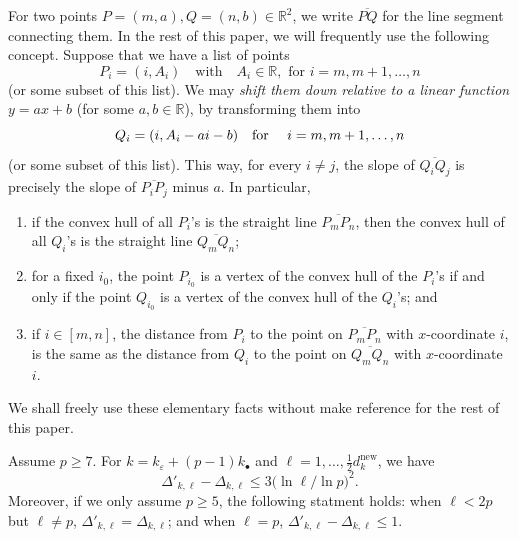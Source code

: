 \begin{notation}
    \label{N:linear_shift_down}
    For two points $P = (m, a), Q = (n,b) \in {\mathbb{R}}^2$, we write $\overline{PQ}$ for the line segment connecting them.
    In the rest of this paper, we will frequently use the following concept. Suppose that we have a list of points $$P_i = (i,A_i) \quad\textrm{with} \quad A_i \in {\mathbb{R}}, \textrm{ for } i = m,m+1, \dots, n$$ (or some subset of this list). We may \emph{shift them down relative to a linear function} $y = ax+b$ (for some $a,b \in {\mathbb{R}}$), by transforming them into $$Q_i  = (i, A_i - ai-b) \textrm{\quad for \quad}i = m,m+1, \dots, n$$ (or some subset of this list).
    This way, for every $i\neq j$, the slope of $\overline {Q_iQ_j}$ is precisely the slope of $\overline{P_iP_j}$ minus $a$. In particular,
    \begin{enumerate}
    \item
    if the convex hull of all $P_i$'s is the straight line $\overline{P_mP_n}$, then the convex hull of all $Q_i$'s is the straight line $\overline{Q_mQ_n}$;
    \item for a fixed $i_0$, the point $P_{i_0}$ is a vertex of the convex hull of the $P_i$'s if and only if the point $Q_{i_0}$ is a vertex of the convex hull of the $Q_i$'s; and
    \item if $i \in [m,n]$, the distance from $P_i$ to the point on $\overline{P_mP_n}$ with $x$-coordinate $i$, is the same as the distance from $Q_i$ to the point on $\overline{Q_mQ_n}$ with $x$-coordinate $i$.
    \end{enumerate}
    We shall freely use these elementary facts without make reference for the rest of this paper.
\end{notation}

\begin{lemma}
    \label{L:Delta_-_Delta_prime_bound}
    Assume $p\geq 7$. For $k =k_\varepsilon  + (p-1)k_{\bullet}$ and $\ell = 1,\dots, \frac 12 d_{k}^{\mathrm{new}}$, we have
    \begin{equation}
    \label{E:Delta_-_Delta_prime_bound}\Delta'_{k, \ell} -
    \Delta_{k, \ell} \leq  3 \big( \ln \ell / \ln p \big)^2.
    \end{equation}
    Moreover, if we only assume $p\geq 5$, the following statment holds: when $\ell < 2p$ but $\ell \neq p$, $\Delta'_{k, \ell} = \Delta_{k, \ell}$; and when $\ell =p$, $\Delta'_{k, \ell}-\Delta_{k, \ell} \leq 1$.
\end{lemma}

